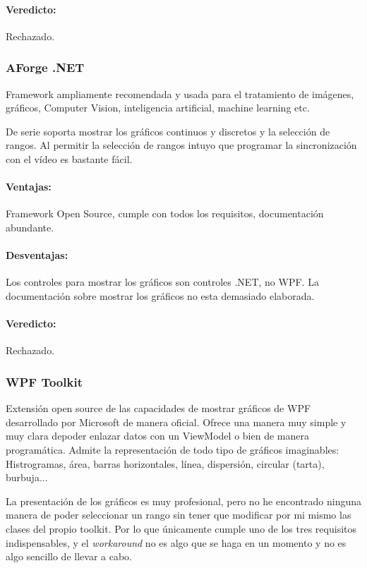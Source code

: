 \paragraph{Veredicto:} Rechazado. 

\subsubsection{AForge .NET}
Framework ampliamente recomendada y usada para el tratamiento de im\'{a}genes, gr\'{a}ficos, Computer Vision, inteligencia artificial, machine learning etc.

De serie soporta mostrar los gr\'{a}ficos continuos y discretos y la selecci\'{o}n de rangos. Al permitir la selecci\'{o}n de rangos
intuyo que programar la sincronizaci\'{o}n con el v\'{i}deo es bastante f\'{a}cil.

\paragraph{Ventajas:} Framework Open Source, cumple con todos los requisitos, documentaci\'{o}n abundante.
\paragraph{Desventajas:} Los controles para mostrar los gr\'{a}ficos son controles .NET, no WPF. La documentaci\'{o}n sobre mostrar los gr\'{a}ficos no
esta demasiado elaborada.
\paragraph{Veredicto:} Rechazado.

\subsubsection{WPF Toolkit}
Extensi\'{o}n open source de las capacidades de mostrar gr\'{a}ficos de WPF desarrollado por Microsoft de manera oficial. 
Ofrece una manera muy simple y muy clara depoder enlazar datos con un ViewModel o bien de manera program\'{a}tica. 
Admite la representaci\'{o}n de todo tipo de gr\'{a}ficos imaginables: Histrogramas, \'{a}rea, barras horizontales, 
l\'{i}nea, dispersi\'{o}n, circular (tarta), burbuja...
 
La presentaci\'{o}n de los gr\'{a}ficos es muy profesional, pero no he encontrado ninguna manera de poder seleccionar un rango sin tener que modificar
por mi mismo las clases del propio toolkit. Por lo que \'{u}nicamente cumple uno de los tres requisitos indispensables, y el \emph{workaround} no
es algo que se haga en un momento y no es algo sencillo de llevar a cabo.

